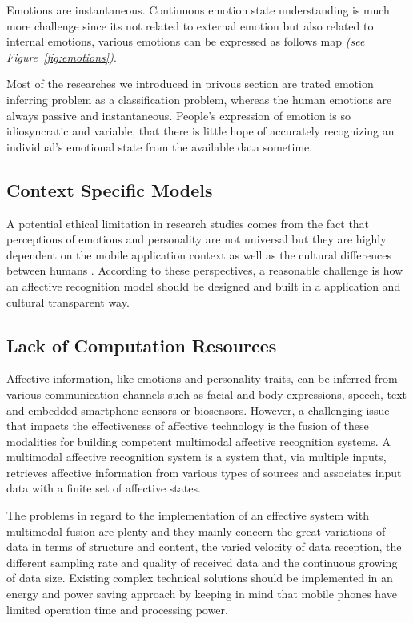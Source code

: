 Emotions are instantaneous. Continuous emotion state understanding is much more challenge since its not related to external emotion but also related to internal emotions, various emotions can be expressed as follows map \textit{(see Figure~\ref{fig:emotions})}.

Most of the researches we introduced in privous section are trated emotion inferring problem as a classification problem, whereas the human emotions are always passive and instantaneous. People's expression of emotion is so idiosyncratic and variable, that there is little hope of accurately recognizing an individual’s emotional state from the available data sometime. 

\subsection{Context Specific Models}

A potential ethical limitation in research studies comes from the fact that perceptions of emotions and personality are not universal but they are highly dependent on the mobile application context \cite{Gao2012, Shah2015, bhattacharya2017predictive, Tikadar2017} as well as the cultural differences between humans \cite{mesquita1992cultural, masuda2008placing, gendron2014perceptions}. According to these perspectives, a reasonable challenge is how an affective recognition model should be designed and built in a application and cultural transparent way.

\subsection{Lack of Computation Resources}

Affective information, like emotions and personality traits, can
be inferred from various communication channels such as facial and body expressions, speech, text and embedded smartphone sensors or biosensors. 
However, a challenging issue that impacts the effectiveness of affective technology is the fusion of these modalities for building competent multimodal affective recognition systems. 
A multimodal affective recognition system is a system that, via multiple inputs, retrieves affective information from various types of sources and associates input data with a finite set of affective states\cite{ganti2011mobile}.

The problems in regard to the implementation of an effective system with multimodal fusion are plenty and they mainly concern the great variations of data in terms of structure and content, the varied velocity of data reception, the different sampling rate and quality of received data and the continuous growing of data size.
Existing complex technical solutions should be implemented in an energy and power saving approach by keeping in mind that mobile phones have limited operation time and processing power. 

